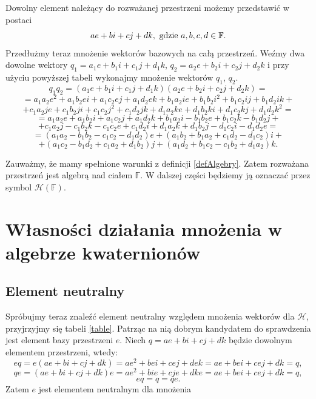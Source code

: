 \documentclass[a4paper,twoside,11pt,reqno]{mwrep}
\theoremstyle{plain} \newtheorem{twr}{Twierdzenie}
\theoremstyle{plain} \newtheorem{lem}{Lemat}
\theoremstyle{definition} \newtheorem{defi}{Definicja}
\theoremstyle{remark} \newtheorem*{wni}{Wniosek}
\theoremstyle{definition} \newtheorem{uwaga}{Uwaga}
\theoremstyle{definition}\newtheorem{prz}{Przykład}
\begin{document}
\noindent
Dowolny element należący do rozważanej przestrzeni możemy przedstawić w postaci
$$ae+bi+cj+dk,\textup{ gdzie }a,b,c,d\in\mathbb{F}.$$ 
Przedłużmy teraz mnożenie wektorów bazowych na całą przestrzeń. Weźmy dwa dowolne wektory 
$q_1=a_1e +b_1 i +c_1j +d_1 k$, $q_2=a_2e +b_2 i +c_2j +d_2 k$ i przy użyciu powyższej tabeli wykonajmy mnożenie wektorów $q_1$, $q_2$. 
$$q_1q_2 = (a_1e +b_1 i +c_1j +d_1 k)(a_2e +b_2 i +c_2j +d_2 k)=$$
$$=a_1a_2 e^2 +a_1b_2ei +a_1c_2ej+a_1d_2ek+b_1a_2 ie +b_1b_2i^2 +b_1c_2ij+b_1d_2ik +$$
$$+c_1a_2je +c_1b_2ji +c_1c_2j^2+c_1d_2jk+d_1a_2 ke +d_1b_2ki +d_1c_2kj+d_1d_2k^2=$$
$$=a_1a_2 e +a_1b_2i +a_1c_2j+a_1d_2k+b_1a_2 i -b_1b_2e +b_1c_2k-b_1d_2j +$$
$$+c_1a_2j -c_1b_2k -c_1c_2e+c_1d_2i+d_1a_2 k +d_1b_2j -d_1c_2i-d_1d_2e=$$
$$= (a_1 a_2-b_1b_2-c_1c_2-d_1d_2)e+(a_1b_2+b_1a_2+c_1d_2-d_1c_2)i+$$
$$+(a_1c_2-b_1d_2+c_1a_2+d_1b_2)j+(a_1d_2+b_1c_2-c_1b_2+d_1a_2)k.$$

Zauważmy, że mamy spełnione warunki z definicji \ref{defAlgebry}. Zatem rozważana przestrzeń jest algebrą nad
ciałem $\mathbb{F}$. W dalszej części będziemy ją oznaczać przez symbol $\mathcal{H}\left(  \mathbb{F}\right)$.



\section{Własności działania mnożenia w algebrze kwaternionów}
\subsection{Element neutralny}
Spróbujmy teraz znaleźć element neutralny względem mnożenia wektorów dla $\mathcal{H}$, przyjrzyjmy się tabeli \ref{table}. Patrząc na nią dobrym kandydatem do sprawdzenia jest element bazy przestrzeni $e$. Niech $q = a e +b i +cj +d k$ będzie dowolnym elementem przestrzeni, wtedy:
$$e q =e( a e +b i +cj +d k) =  a e^2 +b ei +cej +d ek = a e +b ei +cej +d k=q,$$
$$ qe =( a e +b i +cj +d k)e =  a e^2 +b ie +cje +d ke = a e +b ei +cej +d k=q,$$
$$eq=q=qe.$$
Zatem $e$ jest elementem neutralnym dla mnożenia 
\end{document}

